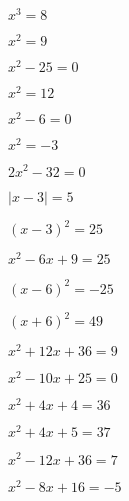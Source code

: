 \begin{bbwAufgabenBlock}
\item $x^3=8$

\item $x^2 = 9$

\item $x^2-25 = 0$

\item $x^2 = 12$

\item $x^2 - 6 = 0$

\item $x^2=-3$
\LoesungsBlock{$\lx=\{ \}$}

\item $2x^2-32 = 0$


\item $|x-3| = 5$


\item $(x-3)^2 = 25 $

\item $x^2-6x+9 = 25$

\item $(x-6)^2 = -25 $
\LoesungsBlock{$\lx = \left\{ \right\}$}

\item $(x+6)^2 = 49$

\item $x^2+12x+36 = 9 $

\item $x^2-10x+25 = 0  $
\LoesungsBlock{$\lx = \left\{ -5 \right\}$}

\item $x^2 + 4x +4 = 36$

\item $x^2+4x+5 = 37$

\item $x^2 -12 x + 36 = 7$

\item $ x^2 - 8x + 16= -5$
\LoesungsBlock{$\lx = \left\{ \right\}$}


\end{bbwAufgabenBlock}

